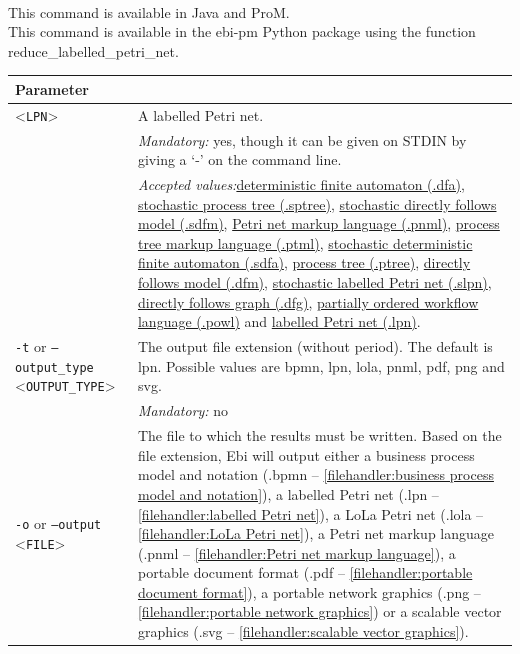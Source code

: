 {\\This command is available in Java and ProM.
\\This command is available in the ebi-pm Python package using the function reduce\_labelled\_petri\_net.
\begin{tabularx}{\linewidth}{lX}
\toprule
Parameter \\\midrule
<\texttt{LPN}>&A labelled Petri net.\\
&\textit{Mandatory:} \quad yes, though it can be given on STDIN by giving a `-' on the command line.\\
&\textit{Accepted values:}\quad \hyperref[filehandler:deterministic finite automaton]{deterministic finite automaton (.dfa)}, \hyperref[filehandler:stochastic process tree]{stochastic process tree (.sptree)}, \hyperref[filehandler:stochastic directly follows model]{stochastic directly follows model (.sdfm)}, \hyperref[filehandler:Petri net markup language]{Petri net markup language (.pnml)}, \hyperref[filehandler:process tree markup language]{process tree markup language (.ptml)}, \hyperref[filehandler:stochastic deterministic finite automaton]{stochastic deterministic finite automaton (.sdfa)}, \hyperref[filehandler:process tree]{process tree (.ptree)}, \hyperref[filehandler:directly follows model]{directly follows model (.dfm)}, \hyperref[filehandler:stochastic labelled Petri net]{stochastic labelled Petri net (.slpn)}, \hyperref[filehandler:directly follows graph]{directly follows graph (.dfg)}, \hyperref[filehandler:partially ordered workflow language]{partially ordered workflow language (.powl)} and \hyperref[filehandler:labelled Petri net]{labelled Petri net (.lpn)}.\\
\texttt{-t} or \texttt{--output\_type} <\texttt{OUTPUT\_TYPE}> &
The output file extension (without period). The default is lpn. Possible values are bpmn, lpn, lola, pnml, pdf, png and svg.\\
&\textit{Mandatory:} \quad no\\
\texttt{-o} or \texttt{--output} <\texttt{FILE}> &
The file to which the results must be written. Based on the file extension, Ebi will output either a business process model and notation (.bpmn -- \cref{filehandler:business process model and notation}), a labelled Petri net (.lpn -- \cref{filehandler:labelled Petri net}), a LoLa Petri net (.lola -- \cref{filehandler:LoLa Petri net}), a Petri net markup language (.pnml -- \cref{filehandler:Petri net markup language}), a portable document format (.pdf -- \cref{filehandler:portable document format}), a portable network graphics (.png -- \cref{filehandler:portable network graphics}) or a scalable vector graphics (.svg -- \cref{filehandler:scalable vector graphics}).

\end{tabularx}}

